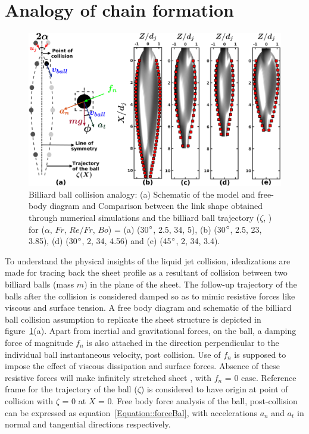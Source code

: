 \documentclass{jfm}
\begin{document}
\section{Analogy of chain formation}	
\begin{figure}%
	\centering
	\includegraphics[width=0.75\linewidth]{Figure7}
	\caption{Billiard ball collision analogy: (a) Schematic of the model and free-body diagram and Comparison between the link shape obtained through numerical simulations and the billiard ball trajectory ($\zeta$, \protect\MarkerSquareRed) for ($\alpha$, $Fr$, $Re/Fr$, $Bo$) = (a) (30$\degree$, 2.5, 34, 5), (b) (30$\degree$, 2.5, 23, 3.85), (d) (30$\degree$, 2, 34, 4.56) and (e) (45$\degree$, 2, 34, 3.4).}
	\label{Figure::analytical}
\end{figure}%
To understand the physical insights of the liquid jet collision, idealizations are made for tracing back the sheet profile as a resultant of collision between two billiard balls (mass $m$) in the plane of the sheet. The follow-up trajectory of the balls after the collision is considered damped so as to mimic resistive forces like viscous and surface tension. A free body diagram and schematic of the billiard ball collision assumption to replicate the sheet structure is depicted in figure~\ref{Figure::analytical}(a). Apart from inertial and gravitational forces, on the ball, a damping force of magnitude $f_n$ is also attached in the direction perpendicular to the individual ball instantaneous velocity, post collision. Use of $f_n$ is supposed to impose the effect of viscous dissipation and surface forces. Absence of these resistive forces will make infinitely stretched sheet \citep{taylor1960formation}, with $f_n$ = 0 case. Reference frame for the trajectory of the ball ($\zeta$) is considered to have origin at point of collision with $\zeta$ = 0 at $X$ = 0. Free body force analysis of the ball, post-collision can be expressed as equation~\ref{Equation::forceBal}, with accelerations $a_n$ and $a_t$ in normal and tangential directions respectively.
\end{document}
